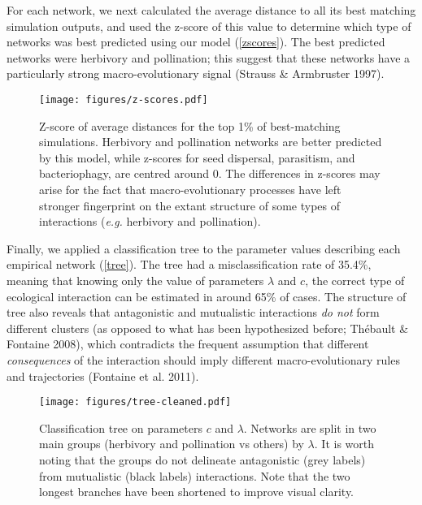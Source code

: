 \documentclass[12pt]{article}
\begin{document}
For each network, we next calculated the average distance to all its
best matching simulation outputs, and used the z-score of this value to
determine which type of networks was best predicted using our model
(\autoref{zscores}). The best predicted networks were herbivory and
pollination; this suggest that these networks have a particularly strong
macro-evolutionary signal (Strauss \& Armbruster 1997).

\begin{figure*}[bt]
    \centering
    \texttt{[image: figures/z-scores.pdf]}
    \caption[Predictive power of the model across different types of networks.]{Z-score of average distances for the top 1\% of best-matching simulations. Herbivory and pollination networks are better predicted by this model, while z-scores for seed dispersal, parasitism, and bacteriophagy, are centred around 0. The differences in z-scores may arise for the fact that macro-evolutionary processes have left stronger fingerprint on the extant structure of some types of interactions (\emph{e.g.} herbivory and pollination).}
    \label{zscores}
\end{figure*}

Finally, we applied a classification tree to the parameter values
describing each empirical network (\autoref{tree}). The tree had a
misclassification rate of 35.4\%, meaning that knowing only the value of
parameters \(\lambda\) and \(c\), the correct type of ecological
interaction can be estimated in around 65\% of cases. The structure of
tree also reveals that antagonistic and mutualistic interactions
\emph{do not} form different clusters (as opposed to what has been
hypothesized before; Thébault \& Fontaine 2008), which contradicts the
frequent assumption that different \emph{consequences} of the
interaction should imply different macro-evolutionary rules and
trajectories (Fontaine et al. 2011).

\begin{figure}[bt]
    \centering
    \texttt{[image: figures/tree-cleaned.pdf]}
    \caption[Classification tree of the networks as a function of best parameters values.]{Classification tree on parameters $c$ and $\lambda$. Networks are split in two main groups (herbivory and pollination vs others) by $\lambda$. It is worth noting that the groups do not delineate antagonistic (grey labels) from mutualistic (black labels) interactions. Note that the two longest branches have been shortened to improve visual clarity.}
    \label{tree}
\end{figure}
\end{document}
